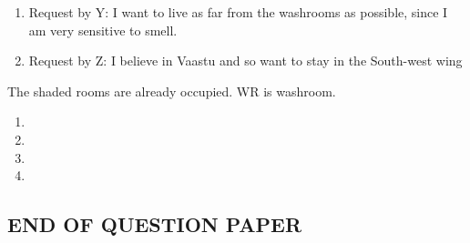 \documentclass[journal,12pt,onecolumn]{IEEEtran}
\theoremstyle{remark}
\begin{document}
\begin{enumerate}
\begin{enumerate}[label = ]
    \item Request by Y: I want to live as far from the washrooms as possible, since I am very sensitive to smell.

    \item Request by Z: I believe in Vaastu and so want to stay in the South-west wing
\end{enumerate}

The shaded rooms are already occupied. WR is washroom.

\begin{multicols}{2}
    \begin{enumerate}
        \item 
        \item 
        \item 
        \item 
    \end{enumerate}
\end{multicols}
\end{enumerate}
\begin{center}
    \subsection*{END OF QUESTION PAPER}
\end{center}
    
\newpage
\end{document}
